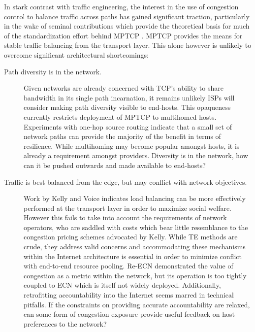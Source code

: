 In stark contrast with traffic engineering, the interest in the use of congestion control to balance traffic across paths has gained significant traction, particularly in the wake of seminal contributions \cite{Key:2007p130,Kelly:2005p140} which provide the theoretical basis for much of the standardization effort behind \ac{MPTCP} \cite{Wischik:2008p137}. 
\ac{MPTCP} provides the means for stable traffic balancing from the transport layer.
This alone however is unlikely to overcome significant architectural shortcomings:

\begin{description}
\item[Path diversity is in the network.]{
    Given networks are already concerned with \ac{TCP}'s ability to share bandwidth in its single path incarnation, it remains unlikely \acp{ISP} will consider making path diversity visible to end-hosts. 
    This opaqueness currently restricts deployment of \ac{MPTCP} to multihomed hosts. 
    Experiments with one-hop source routing \cite{Gummadi:2004p131} indicate that a small set of network paths can provide the majority of the benefit in terms of resilience. 
    While multihoming may become popular amongst hosts, it is already a requirement amongst providers. 
    Diversity is in the network, how can it be pushed outwards and made available to end-hosts?
}

\item[Traffic is best balanced from the edge, but may conflict with network objectives.]{
    Work by Kelly and Voice \cite{Kelly:2005p140} indicates load balancing can be more effectively performed at the transport layer in order to maximize social welfare.
    However this fails to take into account the requirements of network operators, who are saddled with costs which bear little resemblance to the congestion pricing schemes advocated by Kelly.
    While \ac{TE} methods are crude, they address valid concerns and accommodating these mechanisms within the Internet architecture is essential in order to minimize conflict with end-to-end resource pooling. 
    Re-\ac{ECN} \cite{Briscoe:2008p494} demonstrated the value of congestion as a metric within the network, but its operation is too tightly coupled to \ac{ECN} which is itself not widely deployed.
    Additionally, retrofitting accountability into the Internet seems marred in technical pitfalls.
    If the constraints on providing accurate accountability are relaxed, can some form of congestion exposure provide useful feedback on host preferences to the network?
}


\end{description}

